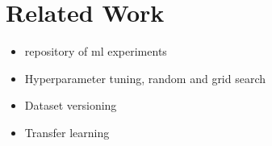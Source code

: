 \section{Related Work} \label{sec-related-work}
\begin{itemize}
\item repository of ml experiments
\item Hyperparameter tuning, random and grid search
\item Dataset versioning
\item Transfer learning
\end{itemize}


